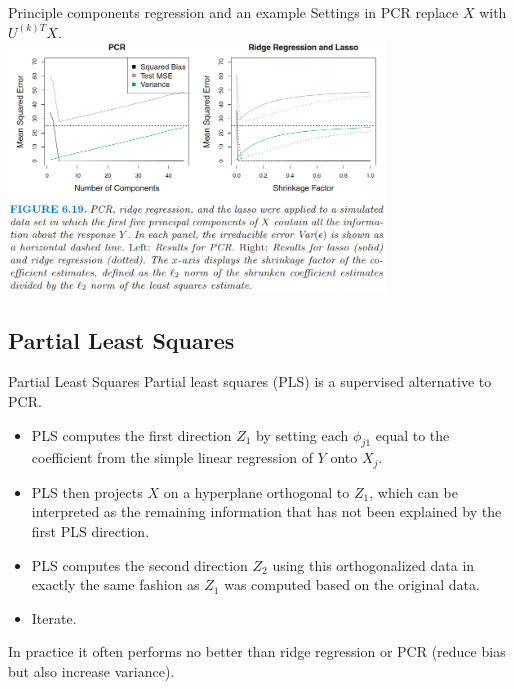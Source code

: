 \documentclass{beamer}
\begin{document}
	\begin{frame}{Principle components regression and an example}
		Settings in PCR replace $X$ with $U^{(k)T}X$. \\
		\includegraphics[width=10cm]{figure_6.19.png}
	\end{frame}
	
	\subsection{Partial Least Squares}
	\begin{frame}{Partial Least Squares}
		Partial least squares (PLS) is a supervised alternative to PCR.
		\begin{itemize}
			\item PLS computes the first direction $Z_1$ by setting each $\phi_{j1}$ equal to the coefficient from the simple linear regression of $Y$ onto $X_j$.
			\item PLS then projects $X$ on a hyperplane orthogonal to $Z_1$, which can be interpreted as the remaining information that has not been explained by the first PLS direction.
			\item PLS computes the second direction $Z_2$ using this orthogonalized data in exactly the same fashion as $Z_1$ was computed based on the original data.
			\item Iterate.
		\end{itemize}
		In practice it often performs no better than ridge regression or PCR (reduce bias but also increase variance).
	\end{frame}
\end{document}

